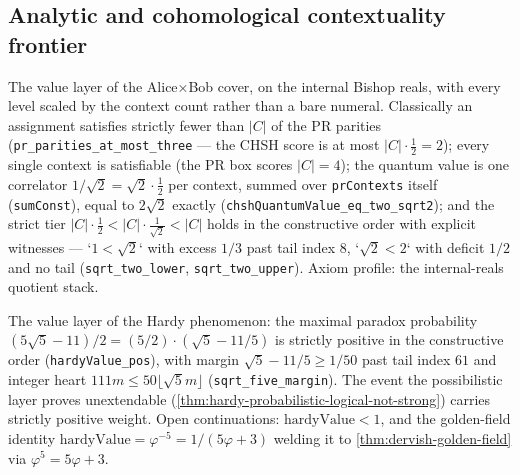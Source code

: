 \subsection{Analytic and cohomological contextuality frontier}

\begin{theorem}\label{thm:chsh-tsirelson-tier}\leanok{}
The value layer of the Alice×Bob cover, on the internal Bishop reals, with every
level scaled by the context count rather than a bare numeral. Classically an
assignment satisfies strictly fewer than \(|C|\) of the PR parities
(\texttt{pr\_parities\_at\_most\_three} --- the CHSH score is at most
\(|C|\cdot\tfrac12 = 2\)); every single context is satisfiable (the PR box
scores \(|C| = 4\)); the quantum value is one correlator \(1/\sqrt2 =
\sqrt2\cdot\tfrac12\) per context, summed over \texttt{prContexts} itself
(\texttt{sumConst}), equal to \(2\sqrt2\) exactly
(\texttt{chshQuantumValue\_eq\_two\_sqrt2}); and the strict tier
\(|C|\cdot\tfrac12 < |C|\cdot\tfrac1{\sqrt2} < |C|\) holds in the
constructive order with explicit witnesses --- `\(1 < \sqrt2\)` with excess
\(1/3\) past tail index 8, `\(\sqrt2 < 2\)` with deficit \(1/2\) and no
tail (\texttt{sqrt\_two\_lower}, \texttt{sqrt\_two\_upper}). Axiom
profile: the internal-reals quotient stack.
\end{theorem}

\begin{theorem}\label{thm:hardy-value-positive}\leanok{}
The value layer of the Hardy phenomenon: the maximal paradox probability
\((5\sqrt5 - 11)/2 = (5/2)\cdot(\sqrt5 - 11/5)\) is strictly positive in
the constructive order (\texttt{hardyValue\_pos}), with margin
\(\sqrt5 - 11/5 \ge 1/50\) past tail index \(61\) and integer heart
\(111m \le 50\lfloor\sqrt5 m\rfloor\) (\texttt{sqrt\_five\_margin}).
The event the possibilistic layer proves unextendable
(\cref{thm:hardy-probabilistic-logical-not-strong}) carries strictly positive
weight. Open continuations: \(\mathrm{hardyValue} < 1\), and the golden-field
identity \(\mathrm{hardyValue} = \varphi^{-5} = 1/(5\varphi+3)\) welding it
to \cref{thm:dervish-golden-field} via \(\varphi^5 = 5\varphi + 3\).
\end{theorem}

